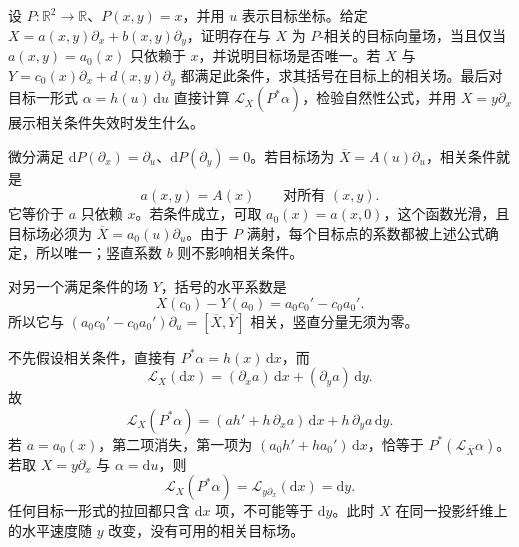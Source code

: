 \begin{exercise}
	\label{g1:exr:1303-projection-related}
	设 \(P:\mathbb R^2\to\mathbb R\)、\(P(x,y)=x\)，并用 \(u\) 表示目标坐标。给定 \(X=a(x,y)\partial_x+b(x,y)\partial_y\)，证明存在与 \(X\) 为 \(P\)-相关的目标向量场，当且仅当 \(a(x,y)=a_0(x)\) 只依赖于 \(x\)，并说明目标场是否唯一。若 \(X\) 与 \(Y=c_0(x)\partial_x+d(x,y)\partial_y\) 都满足此条件，求其括号在目标上的相关场。最后对目标一形式 \(\alpha=h(u)\,\mathrm{d}u\) 直接计算 \(\mathcal L_X(P^*\alpha)\)，检验自然性公式，并用 \(X=y\partial_x\) 展示相关条件失效时发生什么。
\end{exercise}
\begin{solution}
	微分满足 \(\mathrm{d}P(\partial_x)=\partial_u\)、\(\mathrm{d}P(\partial_y)=0\)。若目标场为 \(\overline X=A(u)\partial_u\)，相关条件就是
	\[
		a(x,y)=A(x)\qquad\text{对所有 }(x,y).
	\]
	它等价于 \(a\) 只依赖 \(x\)。若条件成立，可取 \(a_0(x)=a(x,0)\)，这个函数光滑，且目标场必须为 \(\overline X=a_0(u)\partial_u\)。由于 \(P\) 满射，每个目标点的系数都被上述公式确定，所以唯一；竖直系数 \(b\) 则不影响相关条件。

	对另一个满足条件的场 \(Y\)，括号的水平系数是
	\[
		X(c_0)-Y(a_0)=a_0c_0'-c_0a_0'.
	\]
	所以它与 \((a_0c_0'-c_0a_0')\partial_u=[\overline X,\overline Y]\) 相关，竖直分量无须为零。

	不先假设相关条件，直接有 \(P^*\alpha=h(x)\,\mathrm{d}x\)，而
	\[
		\mathcal L_X(\mathrm{d}x)=(\partial_xa)\,\mathrm{d}x+(\partial_ya)\,\mathrm{d}y.
	\]
	故
	\[
		\mathcal L_X(P^*\alpha)
		=(a h'+h\,\partial_xa)\,\mathrm{d}x
		+h\,\partial_ya\,\mathrm{d}y.
	\]
	若 \(a=a_0(x)\)，第二项消失，第一项为 \((a_0h'+ha_0')\,\mathrm{d}x\)，恰等于 \(P^*(\mathcal L_{\overline X}\alpha)\)。若取 \(X=y\partial_x\) 与 \(\alpha=\mathrm{d}u\)，则
	\[
		\mathcal L_X(P^*\alpha)=\mathcal L_{y\partial_x}(\mathrm{d}x)=\mathrm{d}y.
	\]
	任何目标一形式的拉回都只含 \(\mathrm{d}x\) 项，不可能等于 \(\mathrm{d}y\)。此时 \(X\) 在同一投影纤维上的水平速度随 \(y\) 改变，没有可用的相关目标场。
\end{solution}

